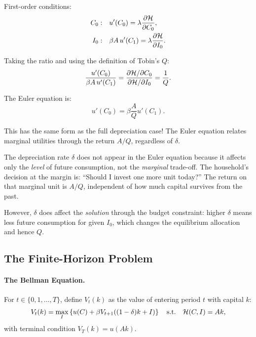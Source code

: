 First-order conditions:
\begin{align}
C_0: & \quad u'(C_0) = \lambda \frac{\partial \mathcal{H}}{\partial C_0}, \label{eq:ac-dep-foc-C} \\
I_0: & \quad \beta A \, u'(C_1) = \lambda \frac{\partial \mathcal{H}}{\partial I_0}. \label{eq:ac-dep-foc-I}
\end{align}

Taking the ratio and using the definition of Tobin's $Q$:
\begin{equation}
\frac{u'(C_0)}{\beta A \, u'(C_1)} = \frac{\partial \mathcal{H} / \partial C_0}{\partial \mathcal{H} / \partial I_0} = \frac{1}{Q}.
\label{eq:ac-dep-ratio}
\end{equation}

The Euler equation is:
\begin{equation}
\boxed{u'(C_0) = \beta \frac{A}{Q} u'(C_1).}
\label{eq:ac-dep-euler}
\end{equation}

This has the same form as the full depreciation case! The Euler equation relates marginal utilities through the return $A/Q$, regardless of $\delta$.

\begin{calloutnote}
The depreciation rate $\delta$ does not appear in the Euler equation because it affects only the \emph{level} of future consumption, not the \emph{marginal} trade-off. The household's decision at the margin is: ``Should I invest one more unit today?'' The return on that marginal unit is $A/Q$, independent of how much capital survives from the past.

However, $\delta$ does affect the \emph{solution} through the budget constraint: higher $\delta$ means less future consumption for given $I_0$, which changes the equilibrium allocation and hence $Q$.
\end{calloutnote}

\subsection{The Finite-Horizon Problem}
\label{subsec:ac-dep-T-period}

\paragraph{The Bellman Equation.}
For $t \in \{0, 1, \ldots, T\}$, define $V_t(k)$ as the value of entering period $t$ with capital $k$:
\begin{equation}
V_t(k) = \max_{I} \left\{ u(C) + \beta V_{t+1}((1-\delta)k + I) \right\} \quad \text{s.t.} \quad \mathcal{H}(C, I) = A k,
\label{eq:ac-dep-bellman}
\end{equation}
with terminal condition $V_T(k) = u(Ak)$.

